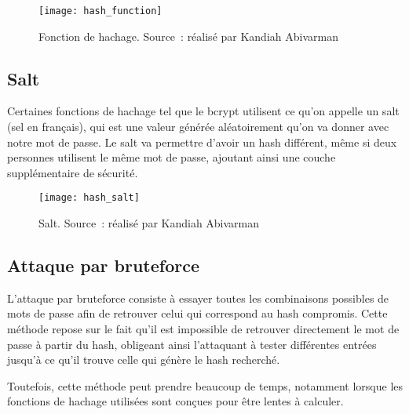 \newpage

\begin{figure}[tbph!]
	\centering
	\texttt{[image: hash\_function]}
	\caption[Fonction de hachage]{Fonction de hachage. Source : réalisé par Kandiah Abivarman}
	\label{fig:fonction_hachage}
\end{figure}


\subsection{Salt}

Certaines fonctions de hachage tel que le bcrypt utilisent ce qu'on appelle un salt (sel en français), qui est une valeur générée aléatoirement qu'on va donner avec notre mot de passe. Le salt va permettre d'avoir un hash différent, même si deux personnes utilisent le même mot de passe, ajoutant ainsi une couche supplémentaire de sécurité.

\begin{figure}[tbph!]
	\centering
	\texttt{[image: hash\_salt]}
	\caption[Salt]{Salt. Source : réalisé par Kandiah Abivarman}
	\label{fig:hash_salt}
\end{figure}

\newpage

\subsection{Attaque par bruteforce}

L'attaque par bruteforce consiste à essayer toutes les combinaisons possibles de mots de passe afin de retrouver celui qui correspond au hash compromis. Cette méthode repose sur le fait qu'il est impossible de retrouver directement le mot de passe à partir du hash, obligeant ainsi l'attaquant à tester différentes entrées jusqu'à ce qu'il trouve celle qui génère le hash recherché.

Toutefois, cette méthode peut prendre beaucoup de temps, notamment lorsque les fonctions de hachage utilisées sont conçues pour être lentes à calculer.